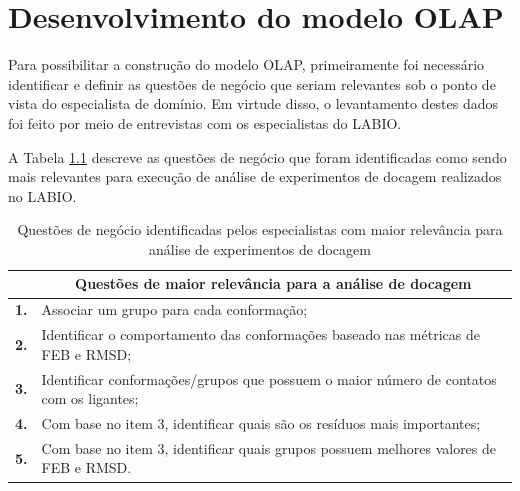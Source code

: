\chapter{Desenvolvimento do modelo OLAP}
\label{cap:DesenvolvimentoDoModeloOLAP}

Para possibilitar a construção do modelo OLAP, primeiramente foi necessário identificar e definir as questões de negócio que seriam relevantes sob o ponto de vista do especialista de domínio. Em virtude disso, o levantamento destes dados foi feito por meio de entrevistas com os especialistas do LABIO.

A Tabela \ref{tab:questaoNegocio} descreve as questões de negócio que foram identificadas como sendo mais relevantes para execução de análise de experimentos de docagem realizados no LABIO. 

\begin{table}[h]
\caption{Questões de negócio identificadas pelos especialistas com maior relevância para análise de experimentos de docagem}
\label{tab:questaoNegocio}
\centering
\begin{tabular}{@{}ll@{}}
\toprule
\textbf{ } & \multicolumn{1}{c}{\textbf{Questões de maior relevância para a análise de docagem}}		\\ \midrule
\textbf{1.} & Associar um grupo para cada conformação;													\\
\textbf{2.} & Identificar o comportamento das conformações baseado nas métricas de FEB e RMSD;			\\
\textbf{3.} & Identificar conformações/grupos que possuem o maior número de contatos com os ligantes;	\\
\textbf{4.} & Com base no item 3, identificar quais são os resíduos mais importantes;					\\
\textbf{5.} & Com base no item 3, identificar quais grupos possuem melhores valores de FEB e RMSD.		\\ \bottomrule
\end{tabular}
\end{table}


